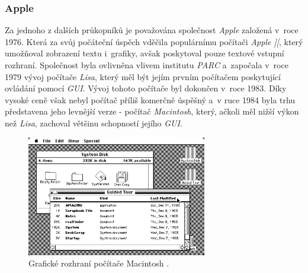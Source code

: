 \documentclass[11pt,twoside,a4paper]{book}
\begin{document}
\subsubsection{Apple}
Za jednoho z dalších průkopníků je považována společnost \textit{Apple} založená v~roce 1976. Která za svůj počáteční úspěch vděčila populárnímu počítači \textit{Apple ][}, který umožňoval zobrazení textu i~grafiky, avšak poskytoval pouze textové vstupní rozhraní. Společnost byla ovlivněna vlivem institutu \textit{PARC} a~započala v~roce 1979 vývoj počítače \textit{Lisa}, který měl být jejím prvním počítačem poskytující ovládání pomocí \textit{GUI}. Vývoj tohoto počítače byl dokončen v~roce 1983. Díky vysoké ceně však nebyl počítač příliš komerčně úspěšný a~v ruce 1984 byla trhu představena jeho levnější verze - počítač \textit{Macintosh}, který, ačkoli měl nižší výkon než \textit{Lisa}, zachoval většinu schopností jejího \textit{GUI}.
\begin{figure}[!ht]
\begin{center}
  \includegraphics[width=0.7\textwidth]{figures/mac}
\caption{{\label{fig:macGUI}}Grafické rozhraní počítače Macintosh \cite{bib:macImage}.}
\end{center}
\end{figure}
\end{document}
